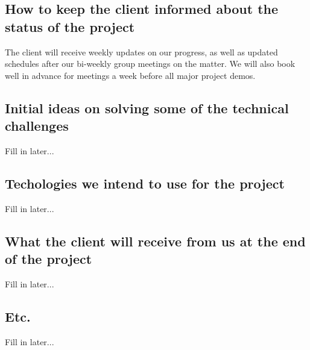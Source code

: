 \documentclass[12pt, oneside]{article}
\begin{document}
	\subsection{How to keep the client informed about the status of the project}
		The client will receive weekly updates on our progress, as well as updated schedules after our bi-weekly group meetings on the matter.
		We will also book well in advance for meetings a week before all major project demos.
		
	\subsection{Initial ideas on solving some of the technical challenges}
		Fill in later...
	\subsection{Techologies we intend to use for the project}
		Fill in later...
	\subsection{What the client will receive from us at the end of the project}
		Fill in later...
	\subsection{Etc.}
		Fill in later...
\end{document}

